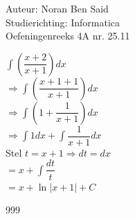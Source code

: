 \documentclass[a4paper]{article}
\begin{document}
  
\noindent \large Auteur: Noran Ben Said \\
\noindent \large Studierichting: Informatica\\
\noindent \large Oefeningenreeks 4A nr. 25.11\\

\medskip

\normalsize

$ \displaystyle\int \left(\dfrac{x + 2}{x + 1}\right) dx $ \\

 
$ \Rightarrow \displaystyle\int \left(\dfrac{x + 1 + 1}{x + 1}\right) dx$\\

$ \Rightarrow \displaystyle\int \left(1 + \dfrac{1}{x + 1}\right) dx$\\

$ \Rightarrow \displaystyle\int 1 dx + \displaystyle\int \dfrac{1}{x + 1} dx $ \\

Stel $t = x + 1 \Rightarrow dt = dx$\\

$ = x + \displaystyle\int \dfrac{dt}{t} $\\


$=x + \ln |x + 1| + C $



\begin{thebibliography}{999}
\end{thebibliography}
\end{document}
